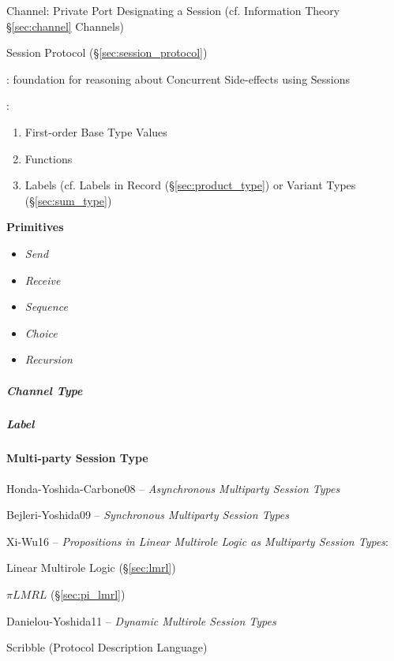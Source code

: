 Channel: Private Port Designating a Session (cf. Information Theory
\S\ref{sec:channel} Channels)

Session Protocol (\S\ref{sec:session_protocol})


\cite{orchard-yoshida15}: foundation for reasoning about Concurrent
Side-effects using Sessions


\cite{neubauer-thiemann04}:
\begin{enumerate}
  \item First-order Base Type Values
  \item Functions
  \item Labels (cf. Labels in Record (\S\ref{sec:product_type}) or
    Variant Types (\S\ref{sec:sum_type})
\end{enumerate}


\textbf{Primitives}

\begin{itemize}
  \item \emph{Send}
  \item \emph{Receive}
  \item \emph{Sequence}
  \item \emph{Choice}
  \item \emph{Recursion}
\end{itemize}



\subparagraph{Channel Type}\label{sec:channel_type}\hfill

\subparagraph{Label}\label{sec:channel_label}\hfill



\paragraph{Multi-party Session Type}\label{sec:multiparty_session}\hfill

Honda-Yoshida-Carbone08 -- \emph{Asynchronous Multiparty Session
  Types} \cite{honda-yoshida-carbone08}

Bejleri-Yoshida09 -- \emph{Synchronous Multiparty Session Types}

Xi-Wu16 -- \emph{Propositions in Linear Multirole Logic as
  Multiparty Session Types}:

Linear Multirole Logic (\S\ref{sec:lmrl})

$\pi LMRL$ (\S\ref{sec:pi_lmrl})

Danielou-Yoshida11 -- \emph{Dynamic Multirole Session Types}

\fist Scribble (Protocol Description Language)

